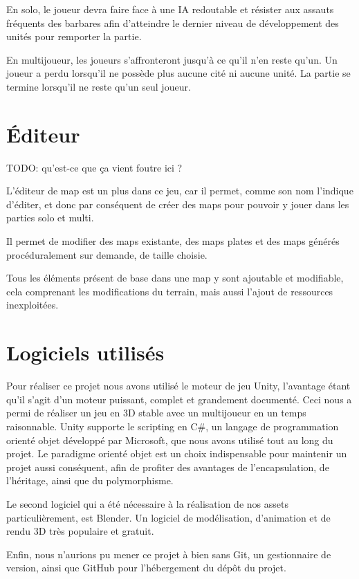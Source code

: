 \documentclass[12pt]{report}
\begin{document}
En solo, le joueur devra faire face à une IA redoutable et résister aux assauts
fréquents des barbares afin d’atteindre le dernier niveau de développement des
unités pour remporter la partie.

En multijoueur, les joueurs s’affronteront jusqu’à ce qu’il n’en reste qu’un. Un
joueur a perdu lorsqu’il ne possède plus aucune cité ni aucune unité. La partie
se termine lorsqu’il ne reste qu’un seul joueur.

\section{Éditeur}

TODO: qu'est-ce que ça vient foutre ici ?

L’éditeur de map est un plus dans ce jeu, car il permet, comme son nom l’indique
d’éditer, et donc par conséquent de créer des maps pour pouvoir y jouer dans les
parties solo et multi.

Il permet de modifier des maps existante, des maps plates et des maps générés
procéduralement sur demande, de taille choisie.

Tous les éléments présent de base dans une map y sont ajoutable et modifiable,
cela comprenant les modifications du terrain, mais aussi l’ajout de ressources
inexploitées.

\section{Logiciels utilisés}

Pour réaliser ce projet nous avons utilisé le moteur de jeu Unity, l’avantage
étant qu’il s’agit d’un moteur puissant, complet et grandement documenté. Ceci
nous a permi de réaliser un jeu en 3D stable avec un multijoueur en un temps
raisonnable. Unity supporte le scripting en C\#, un langage de programmation
orienté objet développé par Microsoft, que nous avons utilisé tout au long du
projet. Le paradigme orienté objet est un choix indispensable pour maintenir un
projet aussi conséquent, afin de profiter des avantages de l’encapsulation, de
l’héritage, ainsi que du polymorphisme.

Le second logiciel qui a été nécessaire à la réalisation de nos assets
particulièrement, est Blender. Un logiciel de modélisation, d’animation et de
rendu 3D très populaire et gratuit.

Enfin, nous n’aurions pu mener ce projet à bien sans Git, un gestionnaire de
version, ainsi que GitHub pour l'hébergement du dépôt du projet.
\end{document}
